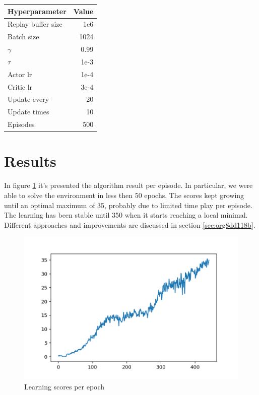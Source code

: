 \documentclass[11pt]{article}
\begin{document}
\begin{center}
\begin{tabular}{lr}
Hyperparameter & Value\\
\hline
Replay buffer size & 1e6\\
Batch size & 1024\\
\(\gamma\) & 0.99\\
\(\tau\) & 1e-3\\
Actor lr & 1e-4\\
Critic lr & 3e-4\\
Update every & 20\\
Update times & 10\\
Episodes & 500\\
\hline
\end{tabular}
\end{center}


\section{Results}
\label{sec:orgc49d0de}
In figure \ref{fig:org94af033} it's presented the algorithm result per episode. In
particular, we were able to solve the environment in less then 50 epochs. The
scores kept growing until an optimal maximum of 35, probably due to limited time
play per episode. The learning has been stable until 350 when it starts reaching
a local minimal. Different approaches and improvements are discussed in section \ref{sec:org8dd118b}. 

\begin{figure}[htbp]
\centering
\includegraphics[width=.9\linewidth]{../contents/solved.png}
\caption{\label{fig:org94af033}Learning scores per epoch}
\end{figure}
\end{document}
